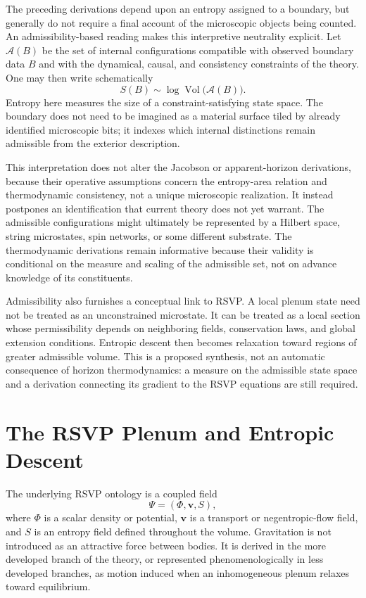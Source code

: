 \documentclass[11pt]{article}
\begin{document}
The preceding derivations depend upon an entropy assigned to a boundary, but generally do not require a final account of the microscopic objects being counted. An admissibility-based reading makes this interpretive neutrality explicit. Let $\mathcal{A}(B)$ be the set of internal configurations compatible with observed boundary data $B$ and with the dynamical, causal, and consistency constraints of the theory. One may then write schematically
\[
S(B) \sim \log \operatorname{Vol}\!\bigl(\mathcal{A}(B)\bigr).
\]
Entropy here measures the size of a constraint-satisfying state space. The boundary does not need to be imagined as a material surface tiled by already identified microscopic bits; it indexes which internal distinctions remain admissible from the exterior description.

This interpretation does not alter the Jacobson or apparent-horizon derivations, because their operative assumptions concern the entropy-area relation and thermodynamic consistency, not a unique microscopic realization. It instead postpones an identification that current theory does not yet warrant. The admissible configurations might ultimately be represented by a Hilbert space, string microstates, spin networks, or some different substrate. The thermodynamic derivations remain informative because their validity is conditional on the measure and scaling of the admissible set, not on advance knowledge of its constituents.

Admissibility also furnishes a conceptual link to RSVP. A local plenum state need not be treated as an unconstrained microstate. It can be treated as a local section whose permissibility depends on neighboring fields, conservation laws, and global extension conditions. Entropic descent then becomes relaxation toward regions of greater admissible volume. This is a proposed synthesis, not an automatic consequence of horizon thermodynamics: a measure on the admissible state space and a derivation connecting its gradient to the RSVP equations are still required.

\section{The RSVP Plenum and Entropic Descent}
\label{sec:plenum}

The underlying RSVP ontology is a coupled field
\[
\Psi = (\Phi,\mathbf{v},S),
\]
where $\Phi$ is a scalar density or potential, $\mathbf{v}$ is a transport or negentropic-flow field, and $S$ is an entropy field defined throughout the volume. Gravitation is not introduced as an attractive force between bodies. It is derived in the more developed branch of the theory, or represented phenomenologically in less developed branches, as motion induced when an inhomogeneous plenum relaxes toward equilibrium.
\end{document}

